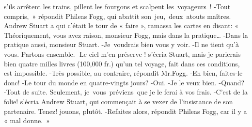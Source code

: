 \documentclass[]{book}
\begin{document}
               
                  
               
                  
               s'ils arrêtent les trains, pillent les fourgons et scalpent les voyageurs !\newline
               -Tout compris, » répondit Phileas Fogg\newline,
               qui abattit son jeu, deux atouts maîtres.
               Andrew Stuart a qui c’était le tour de
                « faire », ramassa les cartes en disant:
               « Théoriquement, vous avez raison,
               monsieur Fogg, mais dans la pratique…\newline
               -Dans la pratique aussi, monsieur 
               Stuart.\newline
               -Je voudrais bien vous y voir.\newline
               -Il ne tient qu'à vous. Partons ensemble.\newline
               -Le ciel m'en préserve ! s'écria Stuart,
               mais je parierais bien quatre milles livres 
               (100,000 fr.) qu'un tel voyage, fait dans ces
               conditions, est impossible.\newline
               -Très possible, au contraire, répondit
               Mr.Fogg.\newline
               -Eh bien, faites-le donc!\newline
               -Le tour du monde en quatre-vingts
               jours?\newline
               -Oui.\newline
               -Je le veux bien.\newline
               -Quand?\newline
               -Tout de suite. Seulement, je vous préviens que je le ferai à vos frais.\newline
               -C'est de la folie! s'écria Andrew
               Stuart, qui commençait à se vexer de l'insistance de son partenaire. Tenez! jouons,
               plutôt.\newline
               -Refaites alors, répondit Phileas Fogg, 
               car il y a « mal donne. »\newline
            
\end{document}
